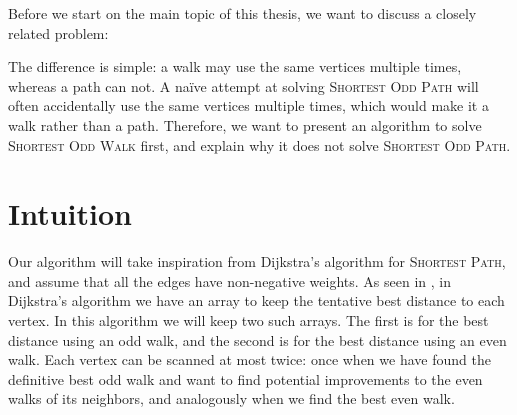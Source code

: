 Before we start on the main topic of this thesis, we want to discuss a closely related problem:

\noindent{}

The difference is simple: a walk may use the same vertices multiple times, whereas a path can not. A naïve attempt at solving \textsc{Shortest Odd Path} will often accidentally use the same vertices multiple times, which would make it a walk rather than a path. Therefore, we want to present an algorithm to solve \textsc{Shortest Odd Walk} first, and explain why it does not solve \textsc{Shortest Odd Path}.

\section{Intuition}
Our algorithm will take inspiration from Dijkstra's algorithm for \textsc{Shortest Path}, and assume that all the edges have non-negative weights. As seen in , in Dijkstra's algorithm we have an array to keep the tentative best distance to each vertex. In this algorithm we will keep two such arrays. The first is for the best distance using an odd walk, and the second is for the best distance using an even walk. Each vertex can be scanned at most twice: once when we have found the definitive best odd walk and want to find potential improvements to the even walks of its neighbors, and analogously when we find the best even walk.

